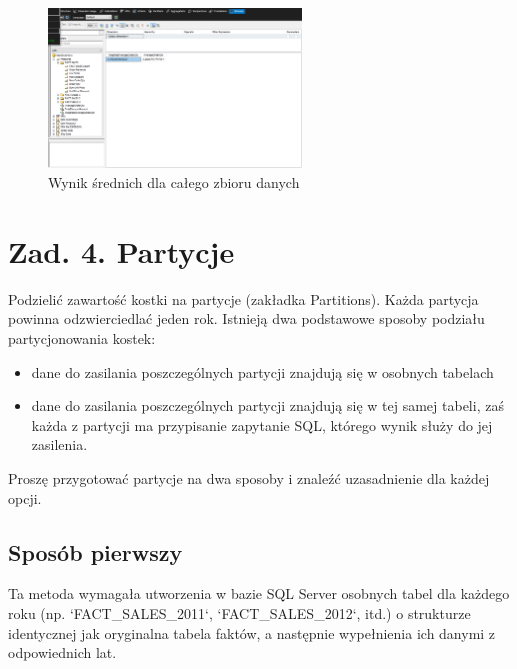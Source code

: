 \documentclass[a4paper,12pt]{article}
\begin{document}
\begin{figure}[H]
  \centering
  \includegraphics[width=0.6\textwidth]{3_result.png}
  \caption{Wynik średnich dla całego zbioru danych}
\end{figure}

\section{Zad. 4. Partycje}

Podzielić zawartość kostki na partycje (zakładka Partitions). Każda partycja powinna
odzwierciedlać jeden rok. Istnieją dwa podstawowe sposoby podziału partycjonowania kostek:
\begin{itemize}
  \item dane do zasilania poszczególnych partycji znajdują się w osobnych tabelach
  \item dane do zasilania poszczególnych partycji znajdują się w tej samej tabeli, zaś każda z partycji ma przypisanie zapytanie SQL, którego wynik służy do jej zasilenia.
\end{itemize}
Proszę przygotować partycje na dwa sposoby i znaleźć uzasadnienie dla każdej opcji.

\subsection{Sposób pierwszy}

Ta metoda wymagała utworzenia w bazie SQL Server osobnych tabel dla każdego roku (np. `FACT\_SALES\_2011`, `FACT\_SALES\_2012`, itd.)
o strukturze identycznej jak oryginalna tabela faktów, a następnie wypełnienia ich danymi z odpowiednich lat.
\end{document}
